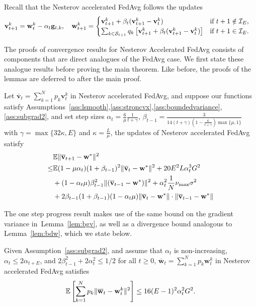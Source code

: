Recall that the Nesterov accelerated FedAvg follows the updates 
\begin{align*}
\mathbf{v}_{t+1}^{k} & =\mathbf{w}_{t}^{k}-\alpha_{t}\mathbf{g}_{t,k}, \hspace{1em}
\mathbf{w}_{t+1}^{k} =\begin{cases}
\mathbf{v}_{t+1}^{k}+\beta_{t}(\mathbf{v}_{t+1}^{k}-\mathbf{v}_{t}^{k}) & \text{if }t+1\notin\mathcal{I}_{E},\\
\sum_{k \in {\mathcal{S}}_{t+1}}q_k\left[\mathbf{v}_{t+1}^{k}+\beta_{t}(\mathbf{v}_{t+1}^{k}-\mathbf{v}_{t}^{k})\right] & \text{if }t+1\in\mathcal{I}_{E}.
\end{cases}
\end{align*}

The proofs of convergence results for Nesterov Accelerated FedAvg consists of components that are direct analogues of the FedAvg case. We first state these analogue results before proving the main theorem. Like before, the proofs of the lemmas are deferred to after the main proof. 

\begin{lemma} Let $\overline{\mathbf{v}}_{t}=\sum_{k=1}^{N}p_{k}\mathbf{v}_{t}^{k}$ in Nesterov accelerated FedAvg,
and suppose our functions satisfy Assumptions~\ref{ass:lsmooth},\ref{ass:stroncvx},\ref{ass:boundedvariance},\ref{ass:subgrad2}, and set step sizes $\alpha_{t}=\frac{6}{\mu}\frac{1}{t+\gamma}$,  $\beta_{t-1}=\frac{3}{14(t+\gamma)(1-\frac{6}{t+\gamma})\max\{\mu,1\}}$
	with $\gamma=\max\{32\kappa,E\}$ and $\kappa=\frac{L}{\mu}$, the updates of Nesterov accelerated FedAvg satisfy
\begin{align*}
&\mathbb{E}\|{\overline{\mathbf{v}}}_{t+1}-{\mathbf{w}}^{\ast}\|^{2} \\
\leq & \mathbb{E}(1-\mu\alpha_{t})(1+\beta_{t-1})^{2}\|{\overline{\mathbf{v}}}_{t}-{\mathbf{w}}^{\ast}\|^{2}+20E^{2}L\alpha_{t}^{3}G^{2}\\
&+(1-\alpha_{t}\mu)\beta_{t-1}^{2}\|({\overline{\mathbf{v}}}_{t-1}-{\mathbf{w}}^{\ast})\|^{2} +\alpha_{t}^{2}\frac{1}{N}\nu_{\max}\sigma^{2}\\
&+2\beta_{t-1}(1+\beta_{t-1})(1-\alpha_{t}\mu)\|{\overline{\mathbf{v}}}_{t}-{\mathbf{w}}^{\ast}\|\cdot\|{\overline{\mathbf{v}}}_{t-1}-{\mathbf{w}}^{\ast}\|
\end{align*}
\label{lem:nest-scvxoner}
\end{lemma}

The one step progress result makes use of the same bound on the gradient variance in~Lemma~\ref{lem:bgv}, as well as a divergence bound analogous to Lemma~\ref{lem:bdw}, which we state below.
\begin{lemma}
Given Assumption~\ref{ass:subgrad2}, and assume that $\alpha_t$ is non-increasing, $\alpha_t \leq 2\alpha_{t+E}$, and $2\beta_{t-1}^{2}+2\alpha_{t}^{2}\leq1/2$ for all $t\geq 0$, $\overline{\mathbf{w}}_{t}=\sum_{k=1}^{N}p_{k}\mathbf{w}_{t}^{k}$ in Nesterov accelerated FedAvg satisfies
	\begin{align*}
	\mathbb{E}\left[\sum_{k=1}^{N}p_{k}\|{\overline{\mathbf{w}}}_{t}-{\mathbf{w}}_{t}^{k}\|^{2} \right]\leq16(E-1)^{2}\alpha_{t}^{2}G^{2}.
	\end{align*}
\label{lem:nest-bdw}
\end{lemma}

